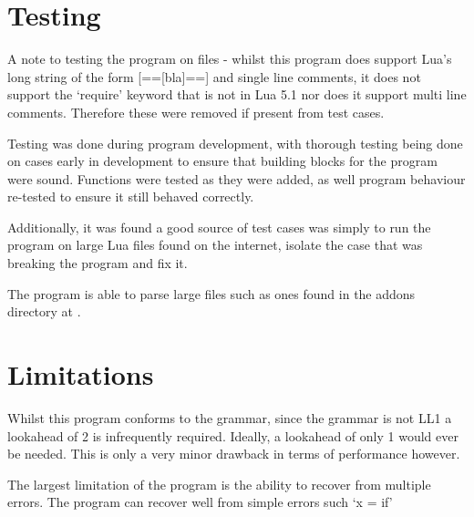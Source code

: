\documentclass[11pt]{article}
\begin{document}
\section*{Testing}

    A note to testing the program on files - whilst this program does support Lua's long string of the form [==[bla]==] and single line comments, it does not support the `require' keyword that is not in Lua 5.1 nor does it support multi line comments. Therefore these were removed if present from test cases. 

    Testing was done during program development, with thorough testing being done on cases early in development to ensure that building blocks for the program were sound. Functions were tested as they were added, as well program behaviour re-tested to ensure it still behaved correctly.

    Additionally, it was found a good source of test cases was simply to run the program on large Lua files found on the internet, isolate the case that was breaking the program and fix it.
    
    The program is able to parse large files such as ones found in the addons directory at \cite{wow_unit_frames_lua}.

\section*{Limitations}

    Whilst this program conforms to the grammar, since the grammar is not LL1 a lookahead of 2 is infrequently required. Ideally, a lookahead of only 1 would ever be needed. This is only a very minor drawback in terms of performance however.

    The largest limitation of the program is the ability to recover from multiple errors. The program can recover well from simple errors such `x = if'



\end{document}
